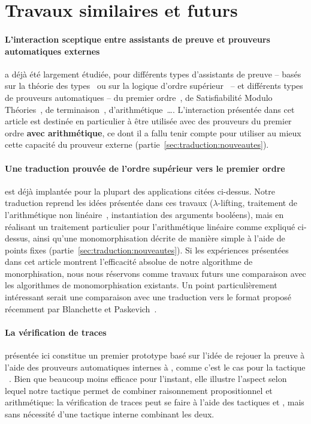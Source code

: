 \section{Travaux similaires et futurs}
\label{sec:similaires}

\paragraph{L'interaction sceptique entre assistants de preuve et
  prouveurs automatiques externes}
a déjà été largement étudiée, pour différents types d'assistants de
preuve -- basés sur la théorie des
types~\cite{DBLP:conf/cpp/ArmandFGKTW11,DBLP:conf/types/Besson06} ou sur
la logique d'ordre supérieur~\cite{Paulson10,KaliszykU12} -- et
différents types de prouveurs automatiques -- du premier
ordre~\cite{Paulson10}, de Satisfiabilité Modulo
Théories~\cite{Paulson10,DBLP:conf/cpp/ArmandFGKTW11,Bohme12}, de
terminaison~\cite{KaliszykU12},
d'arithmétique~\cite{DBLP:conf/types/Besson06}\dots. L'interaction
présentée dans cet article est destinée en particulier à être utilisée
avec des prouveurs du premier ordre \textbf{avec arithmétique}, ce dont
il a fallu tenir compte pour utiliser au mieux cette capacité du
prouveur externe (partie~\ref{sec:traduction:nouveautes}).

\paragraph{Une traduction prouvée de l'ordre supérieur vers le premier
  ordre}
est déjà implantée pour la plupart des applications citées ci-dessus.
Notre traduction reprend les idées présentée dans ces travaux
($\lambda$-lifting, traitement de l'arithmétique non
linéaire~\cite{Bohme12}, instantiation des arguments booléens), mais en
réalisant un traitement particulier pour l'arithmétique linéaire comme
expliqué ci-dessus, ainsi qu'une monomorphisation décrite de manière
simple à l'aide de points
fixes (partie~\ref{sec:traduction:nouveautes}). Si les expériences
présentées dans cet article montrent l'efficacité absolue de notre
algorithme de monorphisation, nous nous réservons comme travaux futurs
une comparaison avec les algorithmes de monomorphisation existants. Un
point particulièrement intéressant serait une comparaison avec une
traduction vers le format \tffone proposé récemment par Blanchette et
Paskevich~\cite{DBLP:conf/cade/BlanchetteP13}.

\paragraph{La vérification de traces} présentée ici constitue un premier
prototype basé sur l'idée de rejouer la preuve à l'aide des prouveurs
automatiques internes à \holfour, comme c'est le cas pour la tactique
\sledgehammer~\cite{Paulson10}. Bien que beaucoup moins efficace pour
l'instant, elle illustre l'aspect selon lequel notre tactique permet de
combiner raisonnement propositionnel et arithmétique: la vérification de
traces peut se faire à l'aide des tactiques \metistac et \coopertac,
mais sans nécessité d'une tactique interne combinant les deux.

